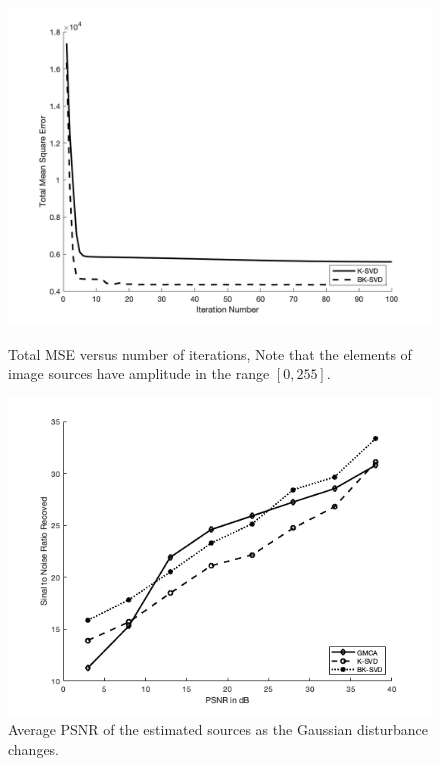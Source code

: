 \begin{figure}[!htbp]
\centering
\begin{minipage}[]{0.49\textwidth}
\includegraphics[width=\textwidth]{images/reconstruction_err.png}
\caption{Total MSE versus number
of iterations, Note that the elements of
image sources have amplitude in the range $[0, 255]$.}
\label{BSS_EV21_1}
\end{minipage}
\begin{minipage}[]{0.49\textwidth}
\includegraphics[width=\textwidth]{images/PSNR_plot.png}
\caption{Average PSNR of the estimated sources as the Gaussian disturbance changes.}
\label{BSS_EV22_2}
\end{minipage}
\end{figure}
